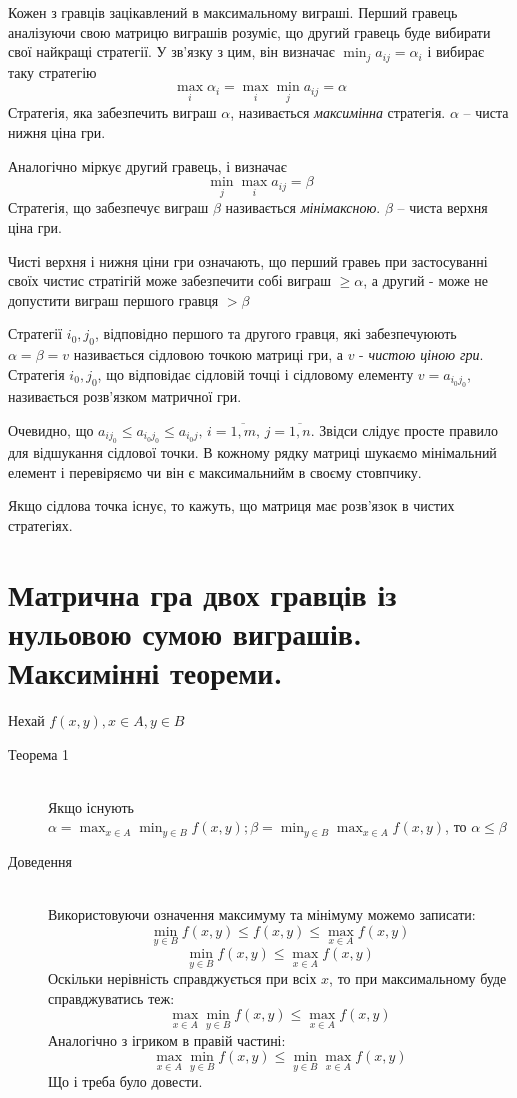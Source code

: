\documentclass[12pt,a4paper]{report}
\begin{document}
Кожен з гравців зацікавлений в максимальному виграші. Перший гравець аналізуючи свою матрицю виграшів розуміє, що другий гравець буде вибирати свої найкращі стратегії. У зв'язку з цим, він визначає $\displaystyle \min_j a_{ij} = \alpha_i$ і вибирає таку стратегію
\begin{equation}
	\max_i \alpha_i = \max_i \min_j a_{ij} = \alpha
\end{equation}
Стратегія, яка забезпечить виграш $\alpha$, називається \emph{максимінна} стратегія. $\alpha$ -- чиста нижня ціна гри.

Аналогічно міркує другий гравець, і визначає
\[
	\min_j \max_i a_{ij} = \beta
\]
Стратегія, що забезпечує виграш $\beta$ називається \emph{мінімаксною}. $\beta$ -- чиста верхня ціна гри.

Чисті верхня і нижня ціни гри означають, що перший гравеь при застосуванні своїх чистис стратігій може забезпечити собі виграш $\ge\alpha$, а другий - може не допустити виграш першого гравця $>\beta$

Стратегії $i_0, j_0$, відповідно першого та другого гравця, які забезпечуюють $\alpha = \beta = v$ називається сідловою точкою матриці гри, а $v$ - \emph{чистою ціною гри}.
Стратегія $i_0, j_0$, що відповідає сідловій точці і сідловому елементу $v=a_{i_0j_0}$, називається розв'язком матричної гри.

Очевидно, що $a_{ij_0} \le a_{i_0j_0} \le a_{i_0j},\,i=\overline{1, m},\,j=\overline{1, n}$. Звідси слідує просте правило для відшукання сідлової точки. В кожному рядку матриці шукаємо мінімальний елемент і перевіряємо чи він є максимальнийм в своєму стовпчику.

Якщо сідлова точка існує, то кажуть, що матриця має розв'язок в чистих стратегіях.

\clearpage

\chapter{Матрична гра двох гравців із нульовою сумою виграшів. Максимінні теореми.}

Нехай $f(x, y), x \in A, y \in B$

\begin{description}

\item[Теорема 1] \hfill \\
Якщо існують $\displaystyle \alpha = \max_{x \in A} \min_{y \in B} f(x, y); \beta = \min_{y \in B} \max_{x \in A} f(x, y)$, то $\alpha \le \beta$

\item[Доведення] \hfill \\
Використовуючи означення максимуму та мінімуму можемо записати:
\[
\min_{y \in B}f(x, y) \le f(x, y) \le \max_{x \in A}f(x, y)
\]
\[
\min_{y \in B}f(x, y) \le \max_{x \in A}f(x, y)
\]
Оскільки нерівність справджується при всіх $x$, то при максимальному буде справджуватись теж:
\[
\max_{x \in A} \min_{y \in B}f(x, y) \le \max_{x \in A}f(x, y)
\]
Аналогічно з ігриком в правій частині:
\[
\max_{x \in A} \min_{y \in B}f(x, y) \le \min_{y \in B} \max_{x \in A}f(x, y)
\]
Що і треба було довести.
\end{description}
\end{document}
